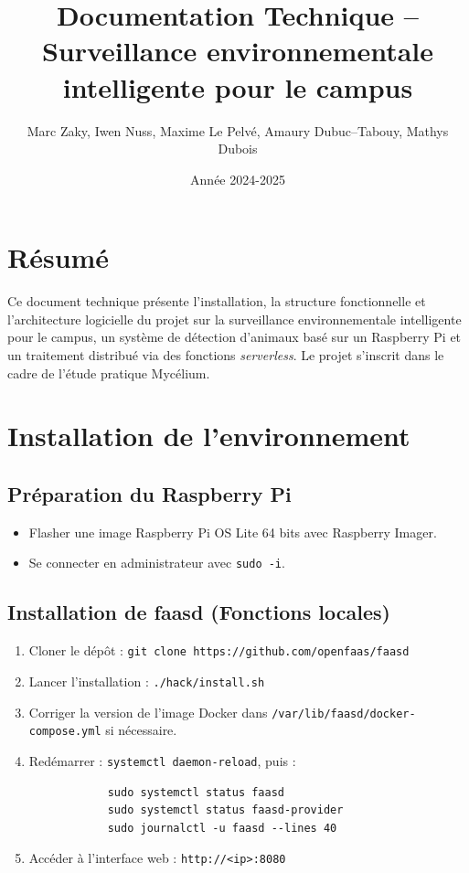 \documentclass[a4paper,11pt]{article}
\title{Documentation Technique – Surveillance environnementale intelligente pour le campus}
\author{Marc Zaky, Iwen Nuss, Maxime Le Pelvé, Amaury Dubuc--Tabouy, Mathys Dubois}
\date{Année 2024-2025}
\begin{document}
	
	\maketitle
	
	\section*{Résumé}
	Ce document technique présente l’installation, la structure fonctionnelle et l’architecture logicielle du projet sur la surveillance environnementale intelligente pour le campus, un système de détection d’animaux basé sur un Raspberry Pi et un traitement distribué via des fonctions \textit{serverless}. Le projet s’inscrit dans le cadre de l’étude pratique Mycélium.
	
	\tableofcontents
	\newpage
	
	\section{Installation de l’environnement}
	
	\subsection{Préparation du Raspberry Pi}
	\begin{itemize}
		\item Flasher une image Raspberry Pi OS Lite 64 bits avec Raspberry Imager.
		\item Se connecter en administrateur avec \texttt{sudo -i}.
	\end{itemize}
	
	\subsection{Installation de faasd (Fonctions locales)}
	\begin{enumerate}
		\item Cloner le dépôt :
		\texttt{git clone https://github.com/openfaas/faasd}
		\item Lancer l’installation : \texttt{./hack/install.sh}
		\item Corriger la version de l’image Docker dans \texttt{/var/lib/faasd/docker-compose.yml} si nécessaire.
		\item Redémarrer : \texttt{systemctl daemon-reload}, puis :
		\begin{verbatim}
			sudo systemctl status faasd
			sudo systemctl status faasd-provider
			sudo journalctl -u faasd --lines 40
		\end{verbatim}
		\item Accéder à l’interface web : \texttt{http://<ip>:8080}
	\end{enumerate}
	
\end{document}
